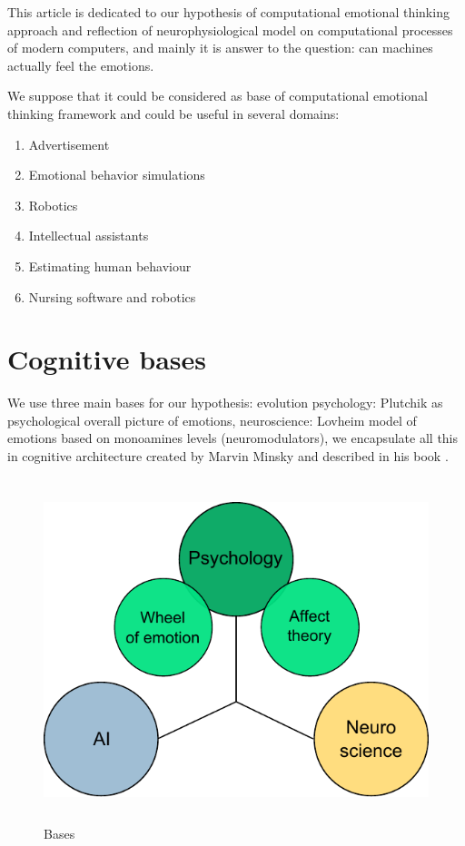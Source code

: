 This article is dedicated to our hypothesis of computational emotional thinking approach and reflection of neurophysiological model on computational processes of modern computers, and mainly it is answer to the question: can machines actually feel the emotions.

We suppose that it could be considered as base of computational emotional thinking framework and could be useful in several domains:

\begin{enumerate}
 \item  Advertisement
 \item  Emotional behavior simulations
 \item  Robotics
 \item  Intellectual assistants
 \item  Estimating human behaviour
 \item  Nursing software and robotics
\end{enumerate}

\section{Cognitive bases}

We use three main bases for our hypothesis: evolution psychology: Plutchik \cite{natureofemotions} as psychological overall picture of emotions, neuroscience: Lovheim \cite{cubeofemotions} model of emotions based on monoamines levels (neuromodulators), we encapsulate all this in cognitive architecture created by Marvin Minsky and described in his book \cite{emotionmachine}.

\begin{figure}
\begin{center}
 \includegraphics[height=10cm]{figure1_3_bases}
\end{center}
\caption{Bases}
\label{figure1_3_bases}
\end{figure}

